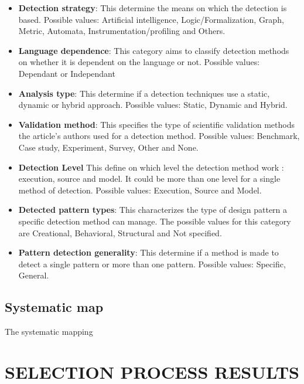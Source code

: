 \documentclass[letterpaper, 10 pt, conference]{ieeeconf}  %
\begin{document}
\begin{itemize}
  \item \textbf{Detection strategy}:
    This determine the means on which the detection is based.
    Possible values: Artificial intelligence, Logic/Formalization, Graph,
    Metric, Automata, Instrumentation/profiling and Others.

  \item \textbf{Language dependence}:
    This category aims to classify detection methods on whether it is dependent
    on the language or not. 
    Possible values: Dependant or Independant

  \item \textbf{Analysis type}:
    This determine if a detection techniques use a static, dynamic or hybrid
    approach.
    Possible values: Static, Dynamic and Hybrid.

  \item \textbf{Validation method}:
    This specifies the type of scientific validation methods the article's 
    authors used for a detection method.
    Possible values: Benchmark, Case study, Experiment, Survey, Other and
    None.
    
  \item \textbf{Detection Level}
    This define on which level the detection method work : execution, source
    and model.
    It could be more than one level for a single method of detection.
    Possible values: Execution, Source and Model.

  \item \textbf{Detected pattern types}:
    This characterizes the type of design pattern a specific detection method
    can manage.
    The possible values for this category are Creational, Behavioral,
    Structural and Not specified.

  \item \textbf{Pattern detection generality}:
    This determine if a method is made to detect a single pattern or more than
    one pattern.
    Possible values: Specific, General.
\end{itemize}



\subsection{Systematic map}
The systematic mapping 

\section{SELECTION PROCESS RESULTS}
\end{document}
